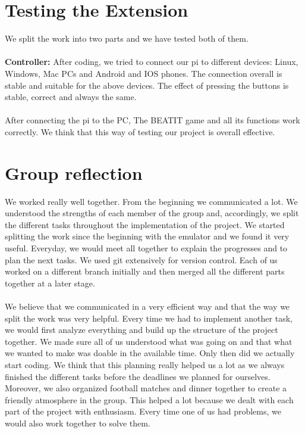 \documentclass[a4paper]{article}
\begin{document}
\section{Testing the Extension}
We split the work into two parts and we have tested both of them.
\\\\
\textbf{Controller:} After coding, we tried to connect our pi to different devices: Linux, Windows, Mac PCs and Android and IOS phones. The connection overall is stable and suitable for the above devices. The effect of pressing the buttons is stable, correct and always the same.
\\\\
After connecting the pi to the PC, The BEATIT game and all its functions work correctly.
We think that this way of testing our project is overall effective.
\section{Group reflection}
We worked really well together. From the beginning we communicated a lot. We understood the strengths of each member of the group and, accordingly, we split the different tasks throughout the implementation of the project. We started splitting the work since the beginning with the emulator and we found it very useful. Everyday, we would meet all together to explain the progresses and to plan the next tasks. We used git extensively for version control. Each of us worked on a different branch initially and then merged all the different parts together at a later stage. 
\\\\
We believe that we communicated in a very efficient way and that the way we split the work was very helpful. Every time we had to implement another task, we would first analyze everything and build up the structure of the project together. We made sure all of us understood what was going on and that what we wanted to make was doable in the available time. Only then did we actually start coding. We think that this planning really helped us a lot as we always finished the different tasks before the deadlines we planned for ourselves. Moreover, we also organized football matches and dinner together to create a friendly atmosphere in the group. This helped a lot because we dealt with each part of the project with enthusiasm. Every time one of us had problems, we would also work together to solve them.
\end{document}
